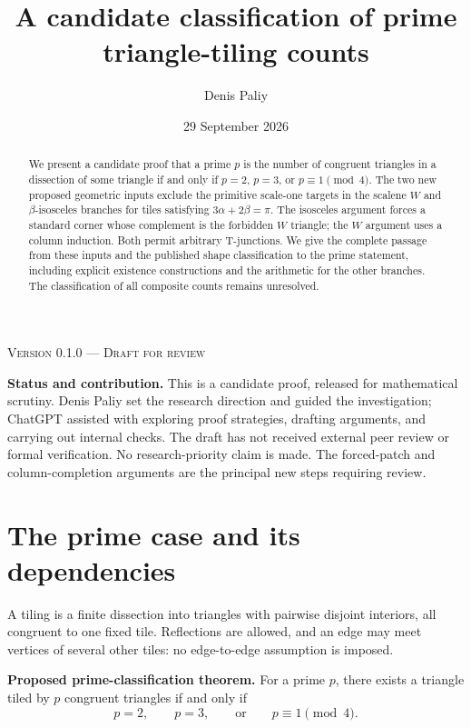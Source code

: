 \documentclass[
  11pt,
  a4paper,
]{article}
\title{A candidate classification of prime triangle-tiling counts}
\author{Denis Paliy}
\date{29 September 2026}
\begin{document}
\maketitle

\begin{center}
\small\textsc{Version 0.1.0 --- Draft for review}
\end{center}

\begin{abstract}
We present a candidate proof that a prime $p$ is the number of congruent
triangles in a dissection of some triangle if and only if $p=2$, $p=3$,
or $p\equiv1\pmod4$. The two new proposed geometric inputs exclude the
primitive scale-one targets in the scalene $W$ and $\beta$-isosceles
branches for tiles satisfying $3\alpha+2\beta=\pi$. The isosceles
argument forces a standard corner whose complement is the forbidden
$W$ triangle; the $W$ argument uses a column induction. Both permit
arbitrary T-junctions. We give the complete passage from these inputs
and the published shape classification to the prime statement, including
explicit existence constructions and the arithmetic for the other
branches. The classification of all composite counts remains unresolved.
\end{abstract}

\noindent\textbf{Status and contribution.} This is a candidate proof,
released for mathematical scrutiny. Denis Paliy set the research
direction and guided the investigation; ChatGPT assisted with exploring
proof strategies, drafting arguments, and carrying out internal checks.
The draft has not received external peer review or formal verification.
No research-priority claim is made. The forced-patch and
column-completion arguments are the principal new steps requiring review.

\section{The prime case and its dependencies}\label{sec:prime}

A tiling is a finite dissection into triangles with pairwise disjoint
interiors, all congruent to one fixed tile. Reflections are allowed, and
an edge may meet vertices of several other tiles: no edge-to-edge
assumption is imposed.

\noindent\textbf{Proposed prime-classification theorem.}
For a prime $p$, there exists a triangle tiled by $p$ congruent triangles
if and only if
\[
\boxed{\quad p=2,\qquad p=3,\qquad\text{or}\qquad p\equiv1\pmod4.\quad}
\]
\end{document}

